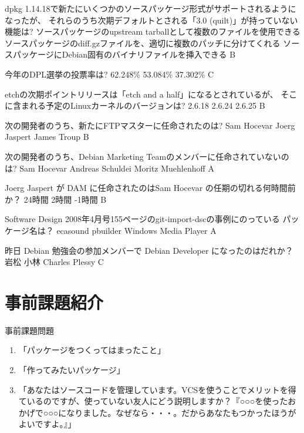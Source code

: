 \documentclass[cjk,dvipdfmx,12pt]{beamer}
\begin{document}
 \santaku
 {dpkg 1.14.18で新たにいくつかのソースパッケージ形式がサポートされるようになったが、
 それらのうち次期デフォルトとされる「3.0 (quilt)」が持っていない機能は?}
 {ソースパッケージのupstream tarballとして複数のファイルを使用できる}
 {ソースパッケージのdiff.gzファイルを、適切に複数のパッチに分けてくれる}
 {ソースパッケージにDebian固有のバイナリファイルを挿入できる}
 {B}
 
 \santaku
 {今年のDPL選挙の投票率は?}
 {62.248\%{}}%
 {53.084\%{}}%
 {37.302\%{}}%
 {C}
 
 \santaku
 {etchの次期ポイントリリースは「etch and a half」になるとされているが、
 そこに含まれる予定のLinuxカーネルのバージョンは?}
 {2.6.18}
 {2.6.24}
 {2.6.25}
 {B}
 
 \santaku
 {次の開発者のうち、新たにFTPマスターに任命されたのは?}
 {Sam Hocevar}
 {Joerg Jaspert}
 {James Troup}
 {B}
 
 \santaku
 {次の開発者のうち、Debian Marketing Teamのメンバーに任命されていないのは?}
 {Sam Hocevar}
 {Andreas Schuldei}
 {Moritz Muehlenhoff}
 {A}

 \santaku
 {Joerg Jaspert が DAM に任命されたのはSam Hocevar の任期の切れる何時間前か？}
 {24時間}
 {2時間}
 {-1時間}
 {B}

 \santaku
 {Software Design 2008年4月号155ページのgit-import-dscの事例にのっている
 パッケージ名は？}
 {ecasound}
 {pbuilder}
 {Windows Media Player}
 {A}

 \santaku
 {昨日 Debian 勉強会の参加メンバーで Debian Developer になったのはだれか？}
 {岩松}
 {小林}
 {Charles Plessy}
 {C}

\section{事前課題紹介}

\begin{frame}{事前課題問題}

\begin{enumerate}
 \item 「パッケージをつくってはまったこと」
 \item 「作ってみたいパッケージ」
 \item 「あなたはソースコードを管理しています。VCSを使うことでメリットを得ているのですが、使っていない友人にどう説明しますか？『○○○を使ったおかげで○○○になりました。なぜなら・・・。だからあなたもつかったほうがよいですよ。』」
\end{enumerate}

\end{frame}
\end{document}
